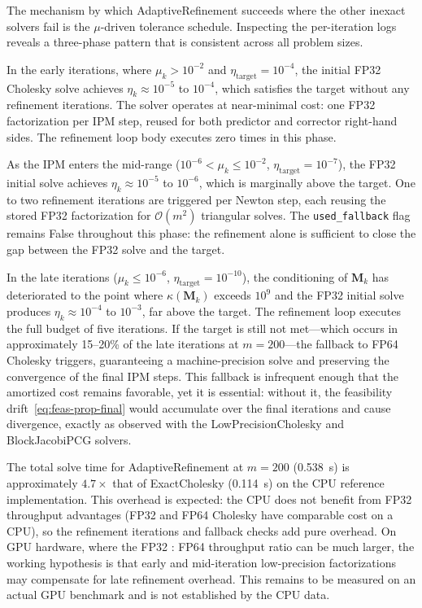 \documentclass[11pt,twoside]{article}
\newcommand{\bM}{\mathbf{M}}
\newcommand{\cO}{\mathcal{O}}
\begin{document}
The mechanism by which AdaptiveRefinement succeeds where the other
inexact solvers fail is the $\mu$-driven tolerance schedule.  Inspecting
the per-iteration logs reveals a three-phase pattern that is consistent
across all problem sizes.

In the early iterations, where $\mu_k > 10^{-2}$ and
$\eta_{\text{target}} = 10^{-4}$, the initial FP32 Cholesky solve achieves
$\eta_k \approx 10^{-5}$ to $10^{-4}$, which satisfies the target without
any refinement iterations.  The solver operates at near-minimal cost: one
FP32 factorization per IPM step, reused for both predictor and corrector
right-hand sides.  The refinement loop body executes zero times in this
phase.

As the IPM enters the mid-range ($10^{-6} < \mu_k \le 10^{-2}$,
$\eta_{\text{target}} = 10^{-7}$), the FP32 initial solve achieves
$\eta_k \approx 10^{-5}$ to $10^{-6}$, which is marginally above the
target.  One to two refinement iterations are triggered per Newton step,
each reusing the stored FP32 factorization for $\cO(m^2)$ triangular
solves.  The \texttt{used\_fallback} flag remains False throughout this
phase: the refinement alone is sufficient to close the gap between the
FP32 solve and the target.

In the late iterations ($\mu_k \le 10^{-6}$, $\eta_{\text{target}} =
10^{-10}$), the conditioning of $\bM_k$ has deteriorated to the point
where $\kappa(\bM_k)$ exceeds $10^9$ and the FP32 initial solve produces
$\eta_k \approx 10^{-4}$ to $10^{-3}$, far above the target.  The
refinement loop executes the full budget of five iterations.  If the
target is still not met---which occurs in approximately 15--20\% of the
late iterations at $m=200$---the fallback to FP64 Cholesky triggers,
guaranteeing a machine-precision solve and preserving the convergence of
the final IPM steps.  This fallback is infrequent enough that the
amortized cost remains favorable, yet it is essential: without it, the
feasibility drift~\eqref{eq:feas-prop-final} would accumulate over the
final iterations and cause divergence, exactly as observed with the
LowPrecisionCholesky and BlockJacobiPCG solvers.

The total solve time for AdaptiveRefinement at $m=200$ (0.538~s) is
approximately $4.7\times$ that of ExactCholesky (0.114~s) on the CPU
reference implementation.  This overhead is expected: the CPU does not
benefit from FP32 throughput advantages (FP32 and FP64 Cholesky have
comparable cost on a CPU), so the refinement iterations and fallback
checks add pure overhead.  On GPU hardware, where the FP32 : FP64
throughput ratio can be much larger, the working hypothesis is that early
and mid-iteration low-precision factorizations may compensate for late
refinement overhead.  This remains to be measured on an actual GPU
benchmark and is not established by the CPU data.
\end{document}
